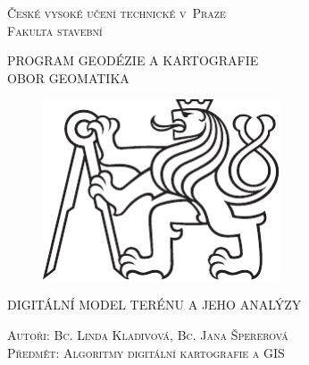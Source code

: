 \documentclass[a4paper,11pt,twoside]{article}
\def\author{Autoři: Bc. Linda Kladivová, Bc. Jana Špererová}
\def\nazevprace{DIGITÁLNÍ MODEL TERÉNU A JEHO ANALÝZY}
\begin{document}
\setcounter{page}{1}  %
\sloppy
\setlength{\parskip}{1pt}



\pagestyle{empty} %

\begin{center}
\renewcommand{\baselinestretch}{1.30} %

\LARGE
\textsc{České vysoké učení technické v~Praze} \\
\textsc{Fakulta stavební} \\

\bigskip

\large
\textsc{PROGRAM GEODÉZIE A KARTOGRAFIE} \\
\textsc{OBOR GEOMATIKA} \\

\vspace{10ex}

\begin{figure}[hbt!] %
\begin{center}
\includegraphics[width=7cm]{pictures/symbol_cvut_konturova_verze_cb.pdf} 
\end{center}
\end{figure}

\vspace{20ex}

\large
\textsc{\nazevprace} \\
\smallskip


\vspace{6ex}

\normalsize
\textsc{\author} \\
\bigskip
\normalsize
\textsc{Předmět: Algoritmy digitální kartografie a GIS} \\

\end{center}
\end{document}
